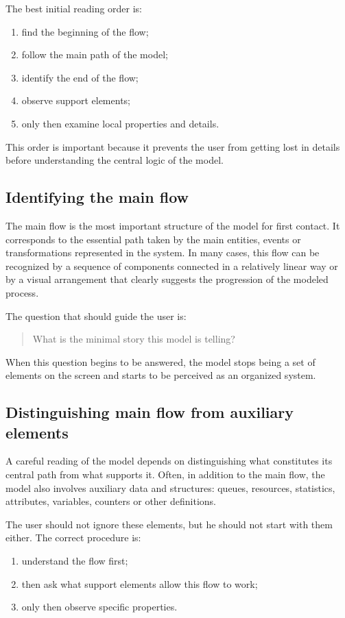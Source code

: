 The best initial reading order is:
\begin{enumerate}
\item find the beginning of the flow;
\item follow the main path of the model;
\item identify the end of the flow;
\item observe support elements;
\item only then examine local properties and details.
\end{enumerate}

This order is important because it prevents the user from getting lost in details before understanding the central logic of the model.

\subsection{Identifying the main flow}
\label{subsec:cap4_identificando_fluxo_principal}

The main flow is the most important structure of the model for first contact. It corresponds to the essential path taken by the main entities, events or transformations represented in the system. In many cases, this flow can be recognized by a sequence of components connected in a relatively linear way or by a visual arrangement that clearly suggests the progression of the modeled process.

The question that should guide the user is:
\begin{quote}
What is the minimal story this model is telling?
\end{quote}

When this question begins to be answered, the model stops being a set of elements on the screen and starts to be perceived as an organized system.

\subsection{Distinguishing main flow from auxiliary elements}
\label{subsec:cap4_fluxo_principal_elementos_auxiliares}

A careful reading of the model depends on distinguishing what constitutes its central path from what supports it. Often, in addition to the main flow, the model also involves auxiliary data and structures: queues, resources, statistics, attributes, variables, counters or other definitions.

The user should not ignore these elements, but he should not start with them either. The correct procedure is:
\begin{enumerate}
\item understand the flow first;
\item then ask what support elements allow this flow to work;
\item only then observe specific properties.
\end{enumerate}

